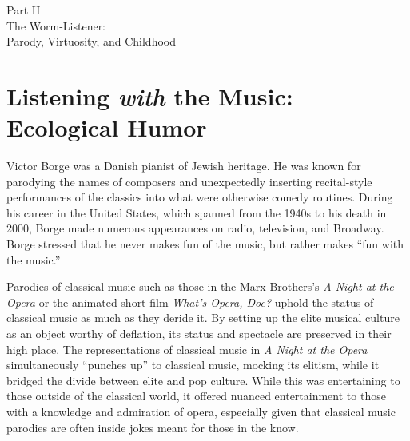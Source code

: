 \documentclass[12pt,letterpaper]{article}
\begin{document}
	\newpage
	\thispagestyle{empty}
	\vspace*{30pt}
	\begin{center}
	{\Huge Part II\\ 
	\Large The Worm-Listener:\\
	Parody, Virtuosity, and Childhood}
	\end{center}


	\newpage
	\section*{Listening \textit{with} the Music: Ecological Humor} 

	Victor Borge was a Danish pianist of Jewish heritage. He was known for 
	parodying the names of composers and unexpectedly inserting 
	recital-style 
	performances of the classics into what were otherwise comedy 
	routines. During his career in the United 
	States, which spanned from the 1940s to his death in 2000, Borge
	made numerous appearances on radio, television, and Broadway. 
	Borge stressed that he never makes fun of the music, but rather makes 
	``fun with the music.'' \autocite[255]{Garrett}
 
	Parodies of classical music such as those in the Marx Brothers's 
	\textit{A Night at the Opera} or the animated short film 
	\textit{What's Opera, 
	Doc?} uphold the status of classical music as much as they deride it. By
	setting up the elite musical culture as an object worthy of deflation, 
	its status and spectacle are preserved in their high 
	place.\autocite[252]{Garrett} The representations of classical music in
	\textit{A Night at the Opera} simultaneously ``punches up'' to classical
	music, mocking its elitism, while it bridged the divide between elite and
	pop culture. While this was entertaining to those outside of the 
	classical world, it offered nuanced entertainment to those with a 
	knowledge and admiration of opera, especially given that classical
	music parodies are often inside jokes meant for those in the
	know.\autocite[251]{Garrett} 
\end{document}
